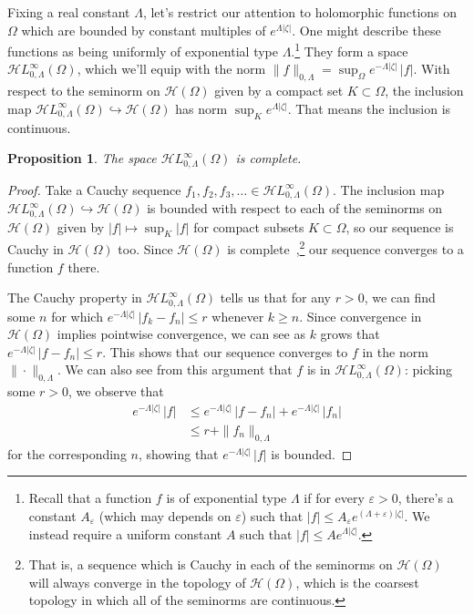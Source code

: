 \documentclass{article}
\theoremstyle{definition}
\theoremstyle{plain}
\newtheorem{prop}{Proposition}
\newcommand{\holo}{\mathcal{H}}
\newcommand{\singexp}[2]{\mathcal{H}L^\infty_{#1, #2}}
\newcommand{\domain}{\Omega}
\begin{document}
Fixing a real constant $\Lambda$, let's restrict our attention to holomorphic functions on $\domain$ which are bounded by constant multiples of $e^{\Lambda|\zeta|}$. One might describe these functions as being uniformly of exponential type $\Lambda$.\footnote{Recall that a function $f$ is of exponential type $\Lambda$ if for every $\varepsilon>0$, there's a constant $A_\varepsilon$ (which may depends on $\varepsilon$) such that $|f|\le A_\varepsilon e^{(\Lambda+\varepsilon)|\zeta|}$. We instead require a uniform constant $A$ such that $|f| \le A e^{\Lambda|\zeta|}$.} They form a space $\singexp{0}{\Lambda}(\domain)$, which we'll equip with the norm $\|f\|_{0,\Lambda} = \sup_\domain e^{-\Lambda|\zeta|}\,|f|$. With respect to the seminorm on $\holo(\domain)$ given by a compact set $K \subset \domain$, the inclusion map $\singexp{0}{\Lambda}(\domain) \hookrightarrow \holo(\domain)$ has norm $\sup_K e^{\Lambda |\zeta|}$. That means the inclusion is continuous.
\begin{prop}\label{exp-complete}
The space $\singexp{0}{\Lambda}(\domain)$ is complete.
\end{prop}
\begin{proof}
Take a Cauchy sequence $f_1, f_2, f_3, \ldots \in \singexp{0}{\Lambda}(\Omega)$. The inclusion map $\singexp{0}{\Lambda}(\Omega) \hookrightarrow \holo(\Omega)$ is bounded with respect to each of the seminorms on $\holo(\Omega)$ given by $|f| \mapsto \sup_K |f|$ for compact subsets $K \subset \Omega$, so our sequence is Cauchy in $\holo(\Omega)$ too. Since $\holo(\Omega)$ is complete~\cite[Proposition~3.5]{fnl-cpx-anal},\footnote{That is, a sequence which is Cauchy in each of the seminorms on $\holo(\Omega)$ will always converge in the topology of $\holo(\Omega)$, which is the coarsest topology in which all of the seminorms are continuous.} our sequence converges to a function $f$ there.

The Cauchy property in $\singexp{0}{\Lambda}(\Omega)$ tells us that for any $r > 0$, we can find some $n$ for which $e^{-\Lambda |\zeta|}\,|f_k - f_n| \le r$ whenever $k \ge n$. Since convergence in $\holo(\Omega)$ implies pointwise convergence, we can see as $k$ grows that $e^{-\Lambda |\zeta|}\,|f - f_n| \le r$. This shows that our sequence converges to $f$ in the norm $\|\cdot\|_{0,\Lambda}$. We can also see from this argument that $f$ is in $\singexp{0}{\Lambda}(\domain)$: picking some $r > 0$, we observe that
\begin{align*}
e^{-\Lambda |\zeta|}\,|f| & \le e^{-\Lambda |\zeta|}\,|f - f_n| + e^{-\Lambda |\zeta|}\,|f_n| \\
& \le r + \|f_n\|_{0,\Lambda}
\end{align*}
for the corresponding $n$, showing that $e^{-\Lambda |\zeta|}\,|f|$ is bounded.
\end{proof}
\end{document}
